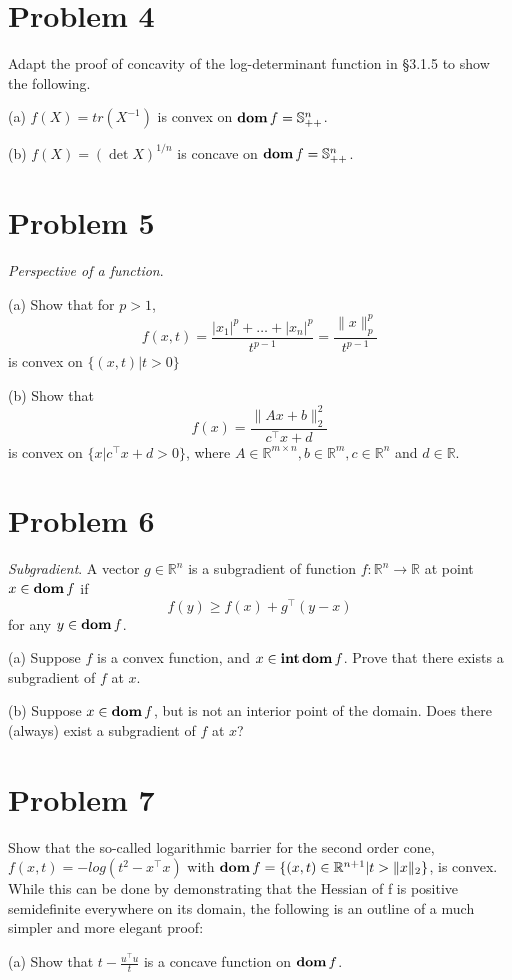 \documentclass[11pt]{article}
\newcommand{\RR}{\mathbb{R}}
\newcommand{\bS}{\mathbb{S}}
\newcommand{\T}{^\top}
\begin{document}
\clearpage
\section*{Problem 4}
Adapt the proof of concavity of the log-determinant function in §3.1.5 to show the following.

(a) $f(X) = tr(X^{-1})$ is convex on $\dom f = \bS^n_{++}$.

(b) $f(X) = (\det X)^{1/n}$ is concave on $\dom f = \bS^n_{++}$.


\clearpage
\section*{Problem 5}
\textit{Perspective of a function}.

(a) Show that for $p>1$,
\[
f(x, t) = \frac{|x_1|^p + \dots + |x_n|^p}{t^{p-1}} = \frac{\|x\|^p_p}{t^{p-1}}
\]
is convex on $\{(x, t)|t>0\}$

(b) Show that
\[
f(x) = \frac{\|Ax+b\|^2_2}{c\T x+d}
\]
is convex on $\{x|c\T x+d > 0\}$, where $A\in \RR^{m\times n}, b\in \RR^m, c\in\RR^n$ and $d\in \RR$.


\clearpage
\section*{Problem 6}
\textit{Subgradient}. A vector $g\in \RR^n$ is a subgradient of function $f:\RR^n \rightarrow \RR$ at point $x\in\mathop{\textbf{dom}} f$ if
\[
f(y) \geq f(x) + g\T (y-x)
\] 
for any $y\in\mathop{\textbf{dom}} f$.

(a) Suppose $f$ is a convex function, and $x\in\mathop{\textbf{int}}\mathop{\textbf{dom}} f$. Prove that there exists a subgradient of $f$ at $x$.

(b) Suppose $x\in\mathop{\textbf{dom}} f$, but is not an interior point of the domain. Does there (always) exist a subgradient of $f$ at $x$?


\clearpage
\section*{Problem 7}
Show that the so-called logarithmic barrier for the second order cone, $f(x, t) = -log(t^2 - x\T x)$ with $\dom f = \{(x,t) \in \RR^{n+1} | t>\|x\|_2\}$, is convex.
While this can be done by demonstrating that the Hessian of f is positive semidefinite everywhere on its domain, the following is an outline of a much simpler and more elegant proof:

(a) Show that $t-\frac{u\T u}{t}$ is a concave function on $\mathop{\textbf{dom}} f$.
\end{document}
